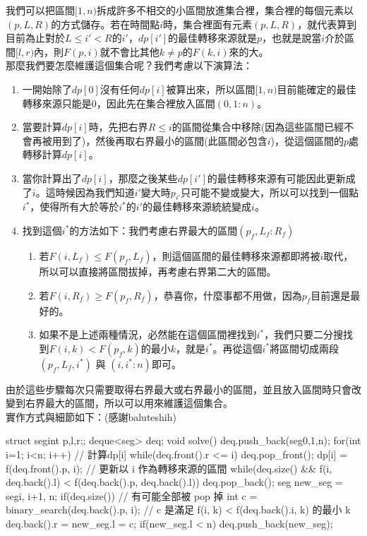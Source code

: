 	我們可以把區間$[1, n)$拆成許多不相交的小區間放進集合裡，集合裡的每個元素以$(p, L, R)$的方式儲存。若在時間點$i$時，集合裡面有元素$(p, L, R)$，就代表算到目前為止對於$L\leq i' < R$的$i'$，$dp[i']$的最佳轉移來源就是$p$，也就是說當$i$介於區間$[l, r)$內，則$F(p, i)$就不會比其他$k \not=p$的$F(k, i)$來的大。\\
	那麼我們要怎麼維護這個集合呢？我們考慮以下演算法：
	\begin{enumerate}
		\item 一開始除了$dp[0]$沒有任何$dp[i]$被算出來，所以區間$[1, n)$目前能確定的最佳轉移來源只能是$0$，因此先在集合裡放入區間$(0, 1: n)$。
		\item 當要計算$dp[i]$時，先把右界$R \leq i$的區間從集合中移除(因為這些區間已經不會再被用到了)，然後再取右界最小的區間(此區間必包含$i$)，從這個區間的$p$處轉移計算$dp[i]$。
		\item 當你計算出了$dp[i]$，那麼之後某些$dp[i']$的最佳轉移來源有可能因此更新成了$i$。這時候因為我們知道$i'$變大時$p_{i'}$只可能不變或變大，所以可以找到一個點$i^*$，使得所有大於等於$i^*$的$i'$的最佳轉移來源統統變成$i$。
		\item 找到這個$i^*$的方法如下：我們考慮右界最大的區間$(p_f, L_f: R_f)$
		\begin{enumerate}
			\item 若$F(i, L_f) \leq F(p_f, L_f)$，則這個區間的最佳轉移來源都即將被$i$取代，所以可以直接將區間拔掉，再考慮右界第二大的區間。
			\item 若$F(i, R_f) \geq F(p_f, R_f)$，恭喜你，什麼事都不用做，因為$p_f$目前還是最好的。
			\item 如果不是上述兩種情況，必然能在這個區間裡找到$i^*$，我們只要二分搜找到$F(i, k) < F(p_f, k)$的最小$k$，就是$i^*$。再從這個$i^*$將區間切成兩段$(p_f, L_f, i^*)$ 與 $(i, i^*: n)$即可。
		\end{enumerate}
	\end{enumerate}
	
	由於這些步驟每次只需要取得右界最大或右界最小的區間，並且放入區間時只會改變到右界最大的區間，所以可以用來維護這個集合。\\
	
	實作方式與細節如下：(感謝baluteshih)\\
	
	\begin{C++}
		struct seg{int p,l,r;};
		deque<seg> deq;
		void solve(){
			deq.push_back(seg{0,1,n});
			for(int i=1; i<n; i++){
				// 計算dp[i]
				while(deq.front().r <= i) deq.pop_front();
				dp[i] = f(deq.front().p, i);
				// 更新以 i 作為轉移來源的區間
				while(deq.size() &&
				f(i, deq.back().l) < f(deq.back().p, deq.back().l))
				deq.pop_back();
				seg new_seg = seg{i, i+1, n};
				if(deq.size()){ // 有可能全部被 pop 掉
					int c = binary_search(deq.back().p, i);
					// c 是滿足 f(i, k) < f(deq.back().i, k) 的最小 k
					deq.back().r = new_seg.l = c;
				}
				if(new_seg.l < n) deq.push_back(new_seg);
			}
		}
	\end{C++}
	
